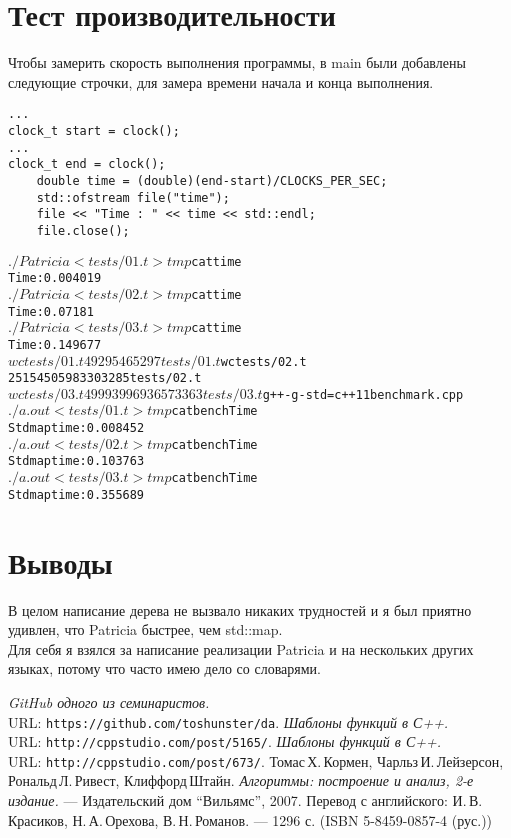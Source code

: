 \documentclass[pdf, unicode, 12pt, a4paper,oneside,fleqn]{article}
\begin{document}
\section{Тест производительности}
Чтобы замерить скорость выполнения программы, в main были добавлены следующие строчки, для замера времени начала и конца выполнения.
\lstset{language=C}
\begin{lstlisting}
...
clock_t start = clock();
...
clock_t end = clock();
    double time = (double)(end-start)/CLOCKS_PER_SEC;
    std::ofstream file("time");
    file << "Time : " << time << std::endl;
    file.close();
\end{lstlisting}
\begin{alltt}
$ ./Patricia < tests/01.t > tmp
$ cat time
Time : 0.004019
$ ./Patricia < tests/02.t > tmp
$ cat time
Time : 0.07181
$ ./Patricia < tests/03.t > tmp
$ cat time
Time : 0.149677
$ wc tests/01.t
  492   954 65297 tests/01.t
$ wc tests/02.t 
  25154   50598 3303285 tests/02.t
$ wc tests/03.t 
  49993   99693 6573363 tests/03.t
$ g++ -g -std=c++11 benchmark.cpp
$ ./a.out < tests/01.t > tmp
$ cat benchTime 
Std map time: 0.008452
$ ./a.out < tests/02.t > tmp
$ cat benchTime 
Std map time: 0.103763
$ ./a.out < tests/03.t > tmp
$ cat benchTime 
Std map time:0.355689
\end{alltt}
\pagebreak

\section{Выводы}
В целом написание дерева не вызвало никаких трудностей и я был приятно удивлен, что Patricia быстрее, чем std::map.\\
Для себя я взялся за написание реализации Patricia и на нескольких других языках, потому что часто имею дело со словарями.
\pagebreak
\begin{thebibliography}{99}
{\itshape GitHub одного из семинаристов.} \\URL: \texttt{https://github.com/toshunster/da}. 
{\itshape Шаблоны функций в С++.} \\URL: \texttt{http://cppstudio.com/post/5165/}. 
{\itshape Шаблоны функций в С++.} \\URL: \texttt{http://cppstudio.com/post/673/}. 
Томас\,Х.\,Кормен, Чарльз\,И.\,Лейзерсон, Рональд\,Л.\,Ривест, Клиффорд\,Штайн.
{\itshape Алгоритмы: построение и анализ, 2-е издание.} --- Издательский дом \enquote{Вильямс}, 2007. Перевод с английского: И.\,В.\,Красиков, Н.\,А.\,Орехова, В.\,Н.\,Романов. --- 1296 с. (ISBN 5-8459-0857-4 (рус.))
\end{thebibliography}
\end{document}
